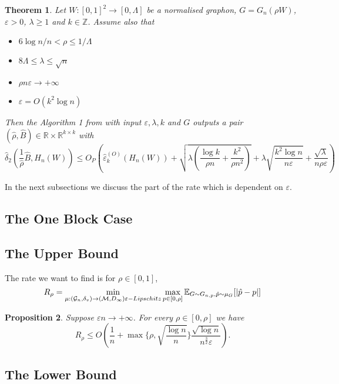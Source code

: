 \documentclass[12pt,a4paper]{article}
\newtheorem{theorem}{Theorem}[section]
\numberwithin{equation}{section}
\newtheorem{proposition}[theorem]{Proposition}
\numberwithin{equation}{section}
\renewcommand{\epsilon}{\varepsilon}
\newcommand{\1}{{\text{\Large $\mathfrak 1$}}}
\newcommand{\2}[1]{{\text{\Large $\mathfrak 1$}\!\left(#1\right)}}
\begin{document}
\begin{theorem}\label{stronger}
Let $W: [0,1]^2 \rightarrow [0,\Lambda]$ be a normalised graphon, $G=G_n(\rho W)$, $ \epsilon>0$, $\lambda \geq 1$ and $k \in \mathbb{Z}$. Assume also that
 \begin{itemize}
\item  $6 \log n/n<\rho \leq 1/\Lambda$
\item $8 \Lambda \leq \lambda  \leq \sqrt{n}$
\item $\rho n \epsilon \rightarrow +\infty$
\item $\epsilon=O(k^2 \log n)$
\end{itemize} 
Then the Algorithm 1 from \cite{Borgs2015} with input $\epsilon,\lambda,k$ and $G$ outputs a pair $(\hat{\rho},\hat{B}) \in \mathbb{R} \times \mathbb{R}^{k \times k}$ with
\begin{equation*}
\hat{\delta}_2\left(\frac{1}{\hat{\rho}}\hat{B},H_n(W)\right) \leq O_P\left(\hat{\epsilon}_k^{(O)}( H_n(W))+\sqrt{\lambda  \left(\frac{\log k}{ \rho n}+\frac{k^2}{\rho n^2}\right)} + \lambda  \sqrt{\frac{k^2\log n}{n \epsilon}}+ \frac{\sqrt{\lambda}}{n \rho \epsilon}\right)
\end{equation*}

\end{theorem}


In the next subsections we discuss the part of the rate which is dependent on $\epsilon$.
\subsection{The One Block Case}

\subsection*{The Upper Bound}

The rate we want to find is for $\rho \in [0,1]$, $$R_{\rho}=\min_{ \mu :(\mathcal{G}_n,\delta_v) \rightarrow (\mathcal{M},D_{\infty}) \\ \epsilon-Lipschitz} \max_{ p \in [0,\rho]} \mathbb{E}_{G \sim G_{n,p},\hat{p} \sim \mu_G}[|\hat{p}-p|]$$

\begin{proposition}\label{thm32}
Suppose $\epsilon n \rightarrow +\infty$. For every $\rho \in [0,\rho]$ we have $$R_{\rho} \leq O \left( \frac{1}{n}+\max\{\rho,\sqrt{\frac{\log n}{n}}\} \frac{\sqrt{\log n}}{n^{\frac{3}{2}} \epsilon} \right).$$
\end{proposition}
\subsection*{The Lower Bound}
\end{document}
